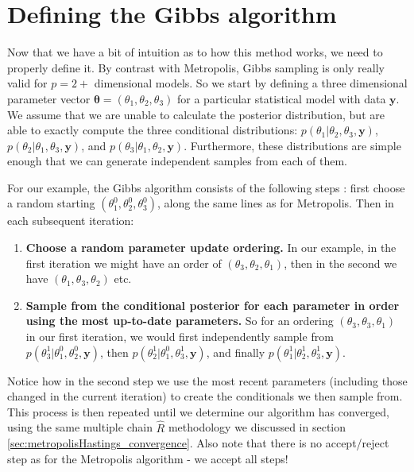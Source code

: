\documentclass[11pt,fullpage]{book}
\begin{document}
\section{Defining the Gibbs algorithm}
Now that we have a bit of intuition as to how this method works, we need to properly define it. By contrast with Metropolis, Gibbs sampling is only really valid for $p=2+$ dimensional models. So we start by defining a three dimensional parameter vector $\boldsymbol{\theta}=(\theta_1,\theta_2,\theta_3)$ for a particular statistical model with data $\boldsymbol{y}$. We assume that we are unable to calculate the posterior distribution, but are able to exactly compute the three conditional distributions: $p(\theta_1|\theta_2,\theta_3,\boldsymbol{y})$, $p(\theta_2|\theta_1,\theta_3,\boldsymbol{y})$, and $p(\theta_3|\theta_1,\theta_2,\boldsymbol{y})$. Furthermore, these distributions are simple enough that we can generate independent samples from each of them. 

For our example, the Gibbs algorithm consists of the following steps \cite{gelman2013bayesian}: first choose a random starting $(\theta_1^0,\theta_2^0,\theta_3^0)$, along the same lines as for Metropolis. Then in each subsequent iteration:

\begin{enumerate}
\item \textbf{Choose a random parameter update ordering.} In our example, in the first iteration we might have an order of $(\theta_3,\theta_2,\theta_1)$, then in the second we have $(\theta_1,\theta_3,\theta_2)$ etc.
\item \textbf{Sample from the conditional posterior for each parameter in order using the most up-to-date parameters.} So for an ordering $(\theta_3,\theta_3,\theta_1)$ in our first iteration, we would first independently sample from $p(\theta_3^1|\theta_1^0,\theta_2^0,\boldsymbol{y})$, then $p(\theta_2^1|\theta_1^0,\theta_3^1,\boldsymbol{y})$, and finally $p(\theta_1^1|\theta_2^1,\theta_3^1,\boldsymbol{y})$.
\end{enumerate}

Notice how in the second step we use the most recent parameters (including those changed in the current iteration) to create the conditionals we then sample from. This process is then repeated until we determine our algorithm has converged, using the same multiple chain $\hat{R}$ methodology we discussed in section \ref{sec:metropolisHastings_convergence}. Also note that there is no accept/reject step as for the Metropolis algorithm - we accept all steps! 
\end{document}

